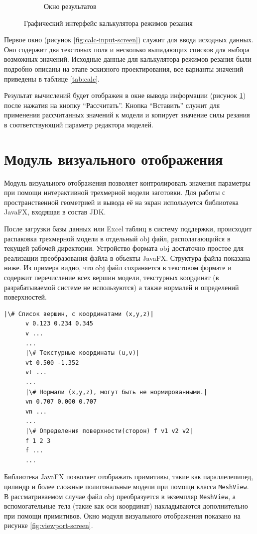 \documentclass[14pt,oneside,final]{extreport}
\begin{document}
\begin{figure}[h!]
\begin{subfigure}[t]{0.5\textwidth}
			\caption{Окно результатов} \label{fig:calc-output-screen}
		\end{subfigure}
		\caption{Графический интерфейс калькулятора режимов резания} \label{fig:calc-screen}
	\end{figure}
	
	Первое окно (рисунок \ref{fig:calc-input-screen}) служит для ввода исходных данных. Оно содержит два текстовых поля и несколько выпадающих списков для выбора возможных значений. Исходные данные для калькулятора режимов резания были подробно описаны на этапе эскизного проектирования, все варианты значений приведены в таблице \ref{tab:calc}.  
		
	Результат вычислений будет отображен в окне вывода информации (рисунок \ref{fig:calc-output-screen}) после нажатия на кнопку ``Рассчитать''. Кнопка ``Вставить'' служит для применения рассчитанных значений к модели и копирует значение силы резания в соответствующий параметр редактора моделей. 	

	\section{Модуль визуального отображения}	
	Модуль визуального отображения позволяет контролировать значения параметры при помощи интерактивной трехмерной модели заготовки. Для работы с пространственной геометрией и вывода её на экран используется библиотека JavaFX, входящая в состав JDK. 
	
	После загрузки базы данных или Excel таблиц в систему поддержки, происходит распаковка трехмерной модели в отдельный obj файл, располагающийся в текущей рабочей директории. Устройство формата obj достаточно простое для реализации преобразования файла в объекты JavaFX. Структура файла показана ниже. Из примера видно, что obj файл сохраняется в текстовом формате и содержит перечисление всех вершин модели, текстурных координат (в разрабатываемой системе не используются) а также нормалей и определений поверхностей. 
	
	\begin{lstlisting}[style=nonumbers]
	  |\# Список вершин, с координатами (x,y,z)|
	  v 0.123 0.234 0.345
	  v ...
	  ...
	  |\# Текстурные координаты (u,v)|
	  vt 0.500 -1.352
	  vt ...
	  ...
	  |\# Нормали (x,y,z), могут быть не нормированными.|
	  vn 0.707 0.000 0.707
	  vn ...
	  ...
	  |\# Определения поверхности(сторон) f v1 v2 v2|
	  f 1 2 3
	  f ...
	  ...
	\end{lstlisting} 

	Библиотека JavaFX позволяет отображать примитивы, такие как параллелепипед, цилиндр и более сложные полигональные модели при помощи класса \texttt{MeshView}. В рассматриваемом случае файл obj преобразуется в экземпляр \texttt{MeshView}, а вспомогательные тела (такие как оси координат) накладываются дополнительно при помощи примитивов. Окно модуля визуального отображения показано на рисунке \ref{fig:viewport-screen}.
	
\end{document}
